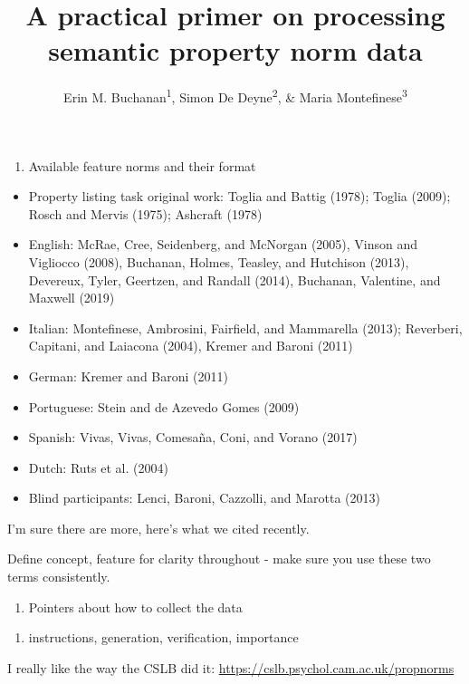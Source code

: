 \documentclass[man]{apa6}
\title{A practical primer on processing semantic property norm data}
\author{Erin M. Buchanan\textsuperscript{1}, Simon De Deyne\textsuperscript{2}, \& Maria Montefinese\textsuperscript{3}}
\date{}
\affiliation{
\vspace{0.5cm}
\textsuperscript{1} Harrisburg University of Science and Technology\\\textsuperscript{2} The University of Adelaide\\\textsuperscript{3} University of Padua}
\providecommand{\tightlist}{%
  \setlength{\itemsep}{0pt}\setlength{\parskip}{0pt}}
\begin{document}
\maketitle

\begin{enumerate}
\def\labelenumi{\arabic{enumi}.}
\tightlist
\item
  Available feature norms and their format
\end{enumerate}

\begin{itemize}
\tightlist
\item
  Property listing task original work: Toglia and Battig (1978); Toglia (2009); Rosch and Mervis (1975); Ashcraft (1978)
\item
  English: McRae, Cree, Seidenberg, and McNorgan (2005), Vinson and Vigliocco (2008), Buchanan, Holmes, Teasley, and Hutchison (2013), Devereux, Tyler, Geertzen, and Randall (2014), Buchanan, Valentine, and Maxwell (2019)
\item
  Italian: Montefinese, Ambrosini, Fairfield, and Mammarella (2013); Reverberi, Capitani, and Laiacona (2004), Kremer and Baroni (2011)
\item
  German: Kremer and Baroni (2011)
\item
  Portuguese: Stein and de Azevedo Gomes (2009)
\item
  Spanish: Vivas, Vivas, Comesaña, Coni, and Vorano (2017)
\item
  Dutch: Ruts et al. (2004)
\item
  Blind participants: Lenci, Baroni, Cazzolli, and Marotta (2013)
\end{itemize}

I'm sure there are more, here's what we cited recently.

Define concept, feature for clarity throughout - make sure you use these two terms consistently.

\begin{enumerate}
\def\labelenumi{\arabic{enumi}.}
\setcounter{enumi}{1}
\tightlist
\item
  Pointers about how to collect the data
\end{enumerate}

\begin{enumerate}
\def\labelenumi{\alph{enumi}.}
\tightlist
\item
  instructions, generation, verification, importance
\end{enumerate}

I really like the way the CSLB did it: \url{https://cslb.psychol.cam.ac.uk/propnorms}
\end{document}
